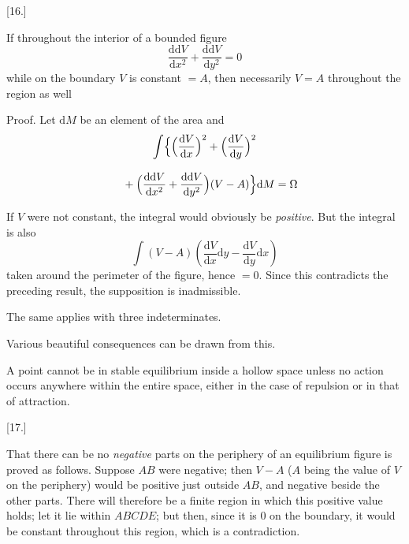 \begingroup
\renewcommand{\arraystretch}{1.45}

\par\medskip{}\centerline{[16.]}\nobreak\smallskip
If throughout the interior of a bounded figure
\[
\frac{\mathrm{dd}V}{\mathrm{d}x^2}
+\frac{\mathrm{dd}V}{\mathrm{d}y^2}=0
\]
while on the boundary $V$ is constant $=A$, then necessarily $V=A$ throughout the region as well


Proof. Let $\mathrm{d}M$ be an element of the area and
\[
\begin{gathered}\int\Bigl\{
\Bigl(\frac{\mathrm{d}V}{\mathrm{d}x}\Bigr)^2
+\Bigl(\frac{\mathrm{d}V}{\mathrm{d}y}\Bigr)^2
\\[8pt]\quad{}+\Bigl(\frac{\mathrm{dd}V}{\mathrm{d}x^2}
+\frac{\mathrm{dd}V}{\mathrm{d}y^2}\Bigr)(V-A)
\Bigr\}\mathrm{d}M=\Omega\end{gathered}
\]



If $V$ were not constant, the integral would obviously be \emph{positive}. But the integral is also
\[
\int(V-A)\left(\frac{\mathrm{d}V}{\mathrm{d}x}\mathrm{d}y
-\frac{\mathrm{d}V}{\mathrm{d}y}\mathrm{d}x\right)
\]
taken around the perimeter of the figure, hence $=0$. Since this contradicts the preceding result,
the supposition is inadmissible.

The same applies with three indeterminates.

Various beautiful consequences can be drawn from this.

A point cannot be in stable equilibrium inside a hollow space unless no action occurs anywhere within the entire space,
either in the case of repulsion or in that of attraction.


\par\medskip{}\centerline{[17.]}\nobreak\smallskip
That there can be no \emph{negative} parts on the periphery of an equilibrium figure
is proved as follows. Suppose $AB$ were negative; then $V-A$ ($A$ being the value
of $V$ on the periphery) would be positive just outside $AB$, and negative beside the other parts. There will therefore be a finite region in which this positive value holds;
let it lie within $ABCDE$; but then, since it is $0$ on the boundary, it would be constant
throughout this region, which is a contradiction.

